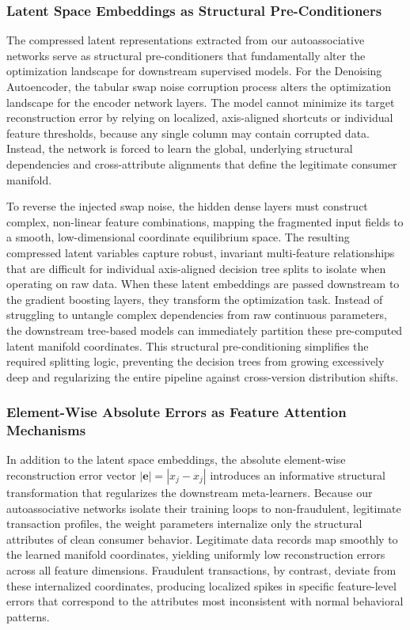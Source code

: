 \subsubsection{Latent Space Embeddings as Structural Pre-Conditioners}

The compressed latent representations extracted from our autoassociative networks serve as structural pre-conditioners that fundamentally alter the optimization landscape for downstream supervised models. For the Denoising Autoencoder, the tabular swap noise corruption process alters the optimization landscape for the encoder network layers. The model cannot minimize its target reconstruction error by relying on localized, axis-aligned shortcuts or individual feature thresholds, because any single column may contain corrupted data. Instead, the network is forced to learn the global, underlying structural dependencies and cross-attribute alignments that define the legitimate consumer manifold.

To reverse the injected swap noise, the hidden dense layers must construct complex, non-linear feature combinations, mapping the fragmented input fields to a smooth, low-dimensional coordinate equilibrium space. The resulting compressed latent variables capture robust, invariant multi-feature relationships that are difficult for individual axis-aligned decision tree splits to isolate when operating on raw data. When these latent embeddings are passed downstream to the gradient boosting layers, they transform the optimization task. Instead of struggling to untangle complex dependencies from raw continuous parameters, the downstream tree-based models can immediately partition these pre-computed latent manifold coordinates. This structural pre-conditioning simplifies the required splitting logic, preventing the decision trees from growing excessively deep and regularizing the entire pipeline against cross-version distribution shifts.

\subsubsection{Element-Wise Absolute Errors as Feature Attention Mechanisms}

In addition to the latent space embeddings, the absolute element-wise reconstruction error vector $|\mathbf{e}| = |x_j - \hat{x}_j|$ introduces an informative structural transformation that regularizes the downstream meta-learners. Because our autoassociative networks isolate their training loops to non-fraudulent, legitimate transaction profiles, the weight parameters internalize only the structural attributes of clean consumer behavior. Legitimate data records map smoothly to the learned manifold coordinates, yielding uniformly low reconstruction errors across all feature dimensions. Fraudulent transactions, by contrast, deviate from these internalized coordinates, producing localized spikes in specific feature-level errors that correspond to the attributes most inconsistent with normal behavioral patterns.

